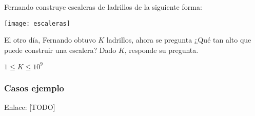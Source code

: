 Fernando construye escaleras de ladrillos de la siguiente forma:
\begin{center}
	\texttt{[image: escaleras]}
\end{center}

El otro día, Fernando obtuvo \(K\) ladrillos, ahora se pregunta ¿Qué tan alto que puede construir una escalera? Dado \(K\), responde su pregunta.

\begin{plimits}
	\item \(1\leq K \leq 10^9\)
\end{plimits}

\subsubsection{Casos ejemplo}
\begin{casebox2}
\end{casebox2}

Enlace: [TODO]